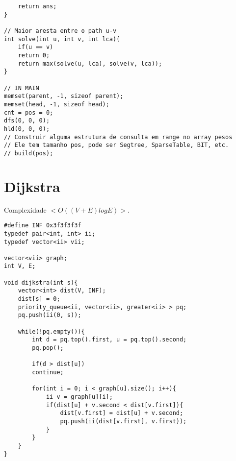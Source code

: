 \begin{multicols}{2}
\begin{lstlisting}
	return ans;
}

// Maior aresta entre o path u-v
int solve(int u, int v, int lca){
	if(u == v)
	return 0;
	return max(solve(u, lca), solve(v, lca));
}

// IN MAIN
memset(parent, -1, sizeof parent);
memset(head, -1, sizeof head);
cnt = pos = 0;
dfs(0, 0, 0);
hld(0, 0, 0);
// Construir alguma estrutura de consulta em range no array pesos
// Ele tem tamanho pos, pode ser Segtree, SparseTable, BIT, etc.
// build(pos); 

\end{lstlisting}
\end{multicols}

\section{Dijkstra}
Complexidade $<O((V + E)log E)>$.
\begin{multicols}{2}
	\begin{lstlisting}
#define INF 0x3f3f3f3f
typedef pair<int, int> ii;
typedef vector<ii> vii;

vector<vii> graph;
int V, E; 

void dijkstra(int s){
	vector<int> dist(V, INF); 
	dist[s] = 0;
	priority_queue<ii, vector<ii>, greater<ii> > pq;
	pq.push(ii(0, s));
	
	while(!pq.empty()){
		int d = pq.top().first, u = pq.top().second;
		pq.pop();
		
		if(d > dist[u])
		continue;
		
		for(int i = 0; i < graph[u].size(); i++){
			ii v = graph[u][i];
			if(dist[u] + v.second < dist[v.first]){
				dist[v.first] = dist[u] + v.second;
				pq.push(ii(dist[v.first], v.first));
			}
		}
	}
}	
	\end{lstlisting}
\end{multicols}

